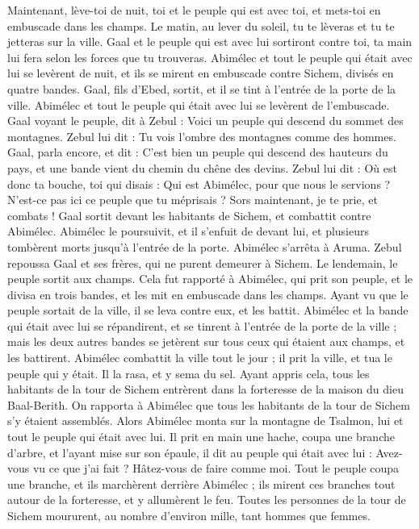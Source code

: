 \begin{multicols}{2}
Maintenant, lève-toi de nuit, toi et le peuple qui est avec toi, et mets-toi en embuscade dans les champs.
Le matin, au lever du soleil, tu te lèveras et tu te jetteras sur la ville. Gaal et le peuple qui est avec lui sortiront contre toi, ta main lui fera selon les forces que tu trouveras.
Abimélec et tout le peuple qui était avec lui se levèrent de nuit, et ils se mirent en embuscade contre Sichem, divisés en quatre bandes.
Gaal, fils d'Ebed, sortit, et il se tint à l'entrée de la porte de la ville. Abimélec et tout le peuple qui était avec lui se levèrent de l'embuscade.
Gaal voyant le peuple, dit à Zebul : Voici un peuple qui descend du sommet des montagnes. Zebul lui dit : Tu vois l'ombre des montagnes comme des hommes.
Gaal, parla encore, et dit : C'est bien un peuple qui descend des hauteurs du pays, et une bande vient du chemin du chêne des devins.
Zebul lui dit : Où est donc ta bouche, toi qui disais : Qui est Abimélec, pour que nous le servions ? N'est-ce pas ici ce peuple que tu méprisais ? Sors maintenant, je te prie, et combats !
Gaal sortit devant les habitants de Sichem, et combattit contre Abimélec.
Abimélec le poursuivit, et il s'enfuit de devant lui, et plusieurs tombèrent morts jusqu'à l'entrée de la porte.
Abimélec s'arrêta à Aruma. Zebul repoussa Gaal et ses frères, qui ne purent demeurer à Sichem.
Le lendemain, le peuple sortit aux champs. Cela fut rapporté à Abimélec,
qui prit son peuple, et le divisa en trois bandes, et les mit en embuscade dans les champs. Ayant vu que le peuple sortait de la ville, il se leva contre eux, et les battit.
Abimélec et la bande qui était avec lui se répandirent, et se tinrent à l'entrée de la porte de la ville ; mais les deux autres bandes se jetèrent sur tous ceux qui étaient aux champs, et les battirent.
Abimélec combattit la ville tout le jour ; il prit la ville, et tua le peuple qui y était. Il la rasa, et y sema du sel.
Ayant appris cela, tous les habitants de la tour de Sichem entrèrent dans la forteresse de la maison du dieu Baal-Berith.
On rapporta à Abimélec que tous les habitants de la tour de Sichem s'y étaient assemblés.
Alors Abimélec monta sur la montagne de Tsalmon, lui et tout le peuple qui était avec lui. Il prit en main une hache, coupa une branche d'arbre, et l'ayant mise sur son épaule, il dit au peuple qui était avec lui : Avez-vous vu ce que j'ai fait ? Hâtez-vous de faire comme moi.
Tout le peuple coupa une branche, et ils marchèrent derrière Abimélec ; ils mirent ces branches tout autour de la forteresse, et y allumèrent le feu. Toutes les personnes de la tour de Sichem moururent, au nombre d'environ mille, tant hommes que femmes.

\end{multicols}
